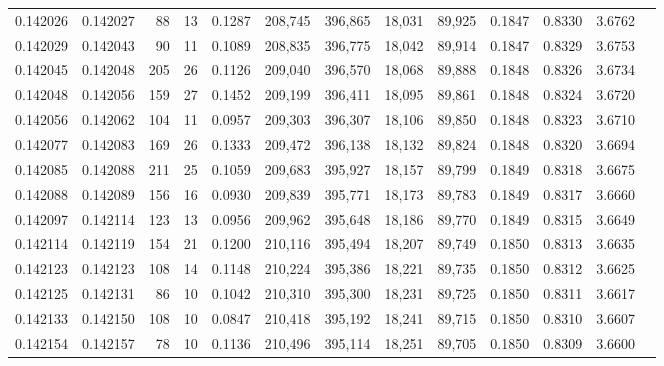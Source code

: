 \begin{tabular}{rrrrrrrrrrrrr}
0.142026 & 0.142027 &    88 &  13 &                                     0.1287 & 208,745 & 396,865 &  18,031 &  89,925 & 0.1847 & 0.8330 & 3.6762 \\
0.142029 & 0.142043 &    90 &  11 &                                     0.1089 & 208,835 & 396,775 &  18,042 &  89,914 & 0.1847 & 0.8329 & 3.6753 \\
0.142045 & 0.142048 &   205 &  26 &                                     0.1126 & 209,040 & 396,570 &  18,068 &  89,888 & 0.1848 & 0.8326 & 3.6734 \\
0.142048 & 0.142056 &   159 &  27 &                                     0.1452 & 209,199 & 396,411 &  18,095 &  89,861 & 0.1848 & 0.8324 & 3.6720 \\
0.142056 & 0.142062 &   104 &  11 &                                     0.0957 & 209,303 & 396,307 &  18,106 &  89,850 & 0.1848 & 0.8323 & 3.6710 \\
0.142077 & 0.142083 &   169 &  26 &                                     0.1333 & 209,472 & 396,138 &  18,132 &  89,824 & 0.1848 & 0.8320 & 3.6694 \\
0.142085 & 0.142088 &   211 &  25 &                                     0.1059 & 209,683 & 395,927 &  18,157 &  89,799 & 0.1849 & 0.8318 & 3.6675 \\
0.142088 & 0.142089 &   156 &  16 &                                     0.0930 & 209,839 & 395,771 &  18,173 &  89,783 & 0.1849 & 0.8317 & 3.6660 \\
0.142097 & 0.142114 &   123 &  13 &                                     0.0956 & 209,962 & 395,648 &  18,186 &  89,770 & 0.1849 & 0.8315 & 3.6649 \\
0.142114 & 0.142119 &   154 &  21 &                                     0.1200 & 210,116 & 395,494 &  18,207 &  89,749 & 0.1850 & 0.8313 & 3.6635 \\
0.142123 & 0.142123 &   108 &  14 &                                     0.1148 & 210,224 & 395,386 &  18,221 &  89,735 & 0.1850 & 0.8312 & 3.6625 \\
0.142125 & 0.142131 &    86 &  10 &                                     0.1042 & 210,310 & 395,300 &  18,231 &  89,725 & 0.1850 & 0.8311 & 3.6617 \\
0.142133 & 0.142150 &   108 &  10 &                                     0.0847 & 210,418 & 395,192 &  18,241 &  89,715 & 0.1850 & 0.8310 & 3.6607 \\
0.142154 & 0.142157 &    78 &  10 &                                     0.1136 & 210,496 & 395,114 &  18,251 &  89,705 & 0.1850 & 0.8309 & 3.6600 \\

\end{tabular}
